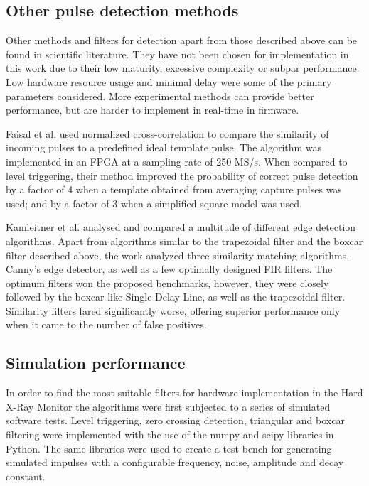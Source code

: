 \subsection{Other pulse detection methods}

Other methods and filters for detection apart from those described above
can be found in scientific literature. They have not been chosen
for implementation in this work due to their low maturity,
excessive complexity or subpar performance. 
Low hardware resource usage and minimal delay
were some of the primary parameters considered.
More experimental methods can provide better performance,
but are harder to implement in real-time in firmware.


Faisal et al. used normalized cross-correlation to compare
the similarity of incoming pulses to a predefined ideal template pulse.
The algorithm was implemented in an FPGA at a sampling rate of 250 MS/s.
When compared to level triggering, 
their method improved the probability of correct pulse detection by a factor of 4
when a template obtained from averaging capture pulses was used;
and by a factor of 3 when a simplified square model was used.
\cite{detection_cross_correlation}


Kamleitner et al. analysed and compared a multitude
of different edge detection algorithms. 
Apart from algorithms similar to the trapezoidal filter and the boxcar
filter described above, the work analyzed three similarity matching algorithms,
Canny's edge detector, as well as a few optimally designed FIR filters.
The optimum filters won the proposed benchmarks, however, they were closely followed by
the boxcar-like Single Delay Line, as well as the trapezoidal filter.
Similarity filters fared significantly worse, offering superior performance
only when it came to the number of false positives.
\cite{pulse_processing_methods}

\subsection{Simulation performance}

In order to find the most suitable filters for hardware implementation
in the Hard X-Ray Monitor the algorithms were first subjected to a
series of simulated software tests.
Level triggering, zero crossing detection, triangular and boxcar 
filtering were implemented with the use of the numpy and scipy
libraries in Python. 
The same libraries were used to create a test bench for generating
simulated impulses with a configurable frequency, noise, amplitude and decay constant.


